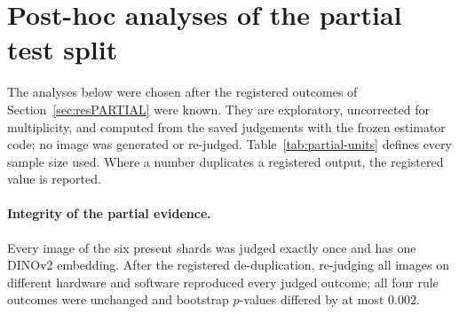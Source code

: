 \section{Post-hoc analyses of the partial test split}\label{sec:resROBUST}
The analyses below were chosen after the registered outcomes of Section~\ref{sec:resPARTIAL} were known. They are exploratory, uncorrected for multiplicity, and computed from the saved judgements with the frozen estimator code; no image was generated or re-judged. Table~\ref{tab:partial-units} defines every sample size used. Where a number duplicates a registered output, the registered value is reported.


\paragraph{Integrity of the partial evidence.} Every image of the six present shards was judged exactly once and has one DINOv2 embedding. After the registered de-duplication, re-judging all \rbRepMatched{} images on different hardware and software reproduced every judged outcome; all four rule outcomes were unchanged and bootstrap $p$-values differed by at most $0.002$.

